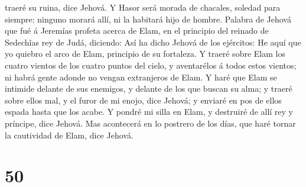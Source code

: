 traeré su ruina, dice Jehová.  Y Hasor será morada de
chacales, soledad para siempre: ninguno morará allí, ni la habitará hijo
de hombre.  Palabra de Jehová que fué á Jeremías profeta
acerca de Elam, en el principio del reinado de Sedechîas rey de Judá,
diciendo:  Así ha dicho Jehová de los ejércitos: He aquí
que yo quiebro el arco de Elam, principio de su fortaleza. 
Y traeré sobre Elam los cuatro vientos de los cuatro puntos del cielo, y
aventarélos á todos estos vientos; ni habrá gente adonde no vengan
extranjeros de Elam.  Y haré que Elam se intimide delante
de sus enemigos, y delante de los que buscan su alma; y traeré sobre
ellos mal, y el furor de mi enojo, dice Jehová; y enviaré en pos de
ellos espada hasta que los acabe.  Y pondré mi silla en
Elam, y destruiré de allí rey y príncipe, dice Jehová.  Mas
acontecerá en lo postrero de los días, que haré tornar la cautividad de
Elam, dice Jehová.

\hypertarget{section-49}{%
\section{50}\label{section-49}}


